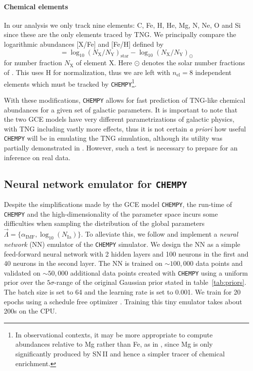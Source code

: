 \documentclass{aa}
\begin{document}
\paragraph{Chemical elements}
In our analysis we only track nine elements: C, Fe, H, He, Mg, N, Ne, O and Si since these are the only elements traced by TNG. We principally compare the logarithmic abundances [X/Fe] and [Fe/H] defined by 
\begin{equation}
     [\mathrm{X}/\mathrm{Y}] = \log_{10}(N_\mathrm X/N_\mathrm Y)_\mathrm{star} - \log_{10}(N_\mathrm X/N_\mathrm Y)_\odot
\end{equation}
for number fraction $N_\mathrm X$ of element X. Here $\odot$ denotes the solar number fractions of \citet{2009ARA&A..47..481A}. This uses H for normalization, thus we are left with $n_\mathrm{el}=8$ independent elements which must be tracked by \texttt{CHEMPY}\footnote{In observational contexts, it may be more appropriate to compute abundances relative to Mg rather than Fe, as in \citep{2019ApJ...874..102W}, since Mg is only significantly produced by SN\,II and hence a simpler tracer of chemical enrichment.}. 

With these modifications, \texttt{CHEMPY} allows for fast prediction of TNG-like chemical abundances for a given set of galactic parameters. It is important to note that the two GCE models have very different parametrizations of galactic physics, with TNG including vastly more effects, thus it is not certain \textit{a priori} how useful \texttt{CHEMPY} will be in emulating the TNG simulation, although its utility was partially demonstrated in \citet{2018ApJ...861...40P}. However,  such a test is necessary to prepare for an inference on real data.


\subsection{Neural network emulator for \texttt{CHEMPY}}
Despite the simplifications made by the GCE model \texttt{CHEMPY}, the run-time of \texttt{CHEMPY} and the high-dimensionality of the parameter space incurs some difficulties when sampling the distribution of the global parameters $\vec\Lambda = \{\alpha_\mathrm{IMF},\log_{10}(N_\mathrm{Ia})\}$. 
To alleviate this, we follow \cite{Philcox_2019} and implement a \textit{neural network} (NN) emulator of the \texttt{CHEMPY} simulator. We design the NN as a simple feed-forward neural network with 2 hidden layers and 100 neurons in the first and 40 neurons in the second layer. The NN is trained on $\sim100,000$ data points and validated on $\sim50,000$ additional data points created with \texttt{CHEMPY} using a uniform prior over the $5\sigma$-range of the original Gaussian prior stated in table~\ref{tab:priors}. The batch size is set to 64 and the learning rate is set to 0.001. We train for 20 epochs using a schedule free optimizer \citep{schedulefree}. 
Training this tiny emulator takes about 200s on the CPU.
\end{document}
